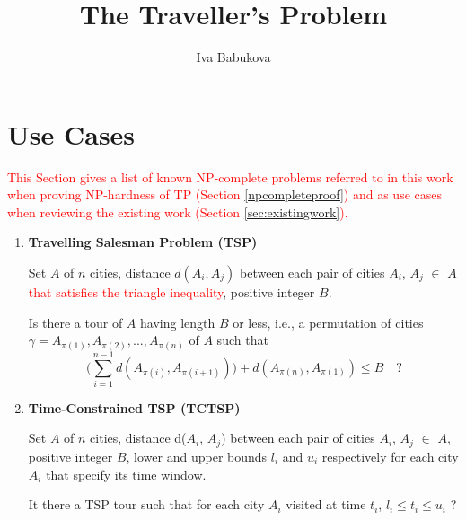 \documentclass{article}
\title{The Traveller's Problem}
\author{Iva Babukova}
\theoremstyle{definition}
\begin{document}
\maketitle

\section{Use Cases}
\label{npcompleteproblems}

\textcolor{red}{This Section gives a list of known NP-complete problems \citep{thebible} referred to in this work when proving NP-hardness of TP (Section \ref{npcompleteproof}) and as use cases when reviewing the existing work (Section \ref{sec:existingwork}).}

\begin{enumerate}
\item \textbf{Travelling Salesman Problem (TSP)}

\begin{instance}
Set $A$ of $n$ cities, distance $d(A_{i}, A_{j})$ between each pair of cities $A_{i}$, $A_{j}$ $\in$ $A$ \textcolor{red}{that satisfies the triangle inequality}, positive integer $B$.
\end{instance}

\begin{question}
Is there a tour of $A$ having length $B$ or less, i.e., a permutation of cities $\gamma = A_{\pi(1)}, A_{\pi(2)},...,A_{\pi(n)}$ of $A$ such that
$$\bigg( \sum_{i=1}^{n-1} d(A_{\pi(i)}, A_{\pi(i+1)}) \bigg) + d(A_{\pi(n)}, A_{\pi(1)}) \leq B \quad \textrm{?}$$
\end{question}

\item \textbf{Time-Constrained TSP (TCTSP)}

\begin{instance}
Set $A$ of $n$ cities, distance d($A_{i}$, $A_{j}$) between each pair of cities $A_{i}$, $A_{j}$ $\in$ $A$, positive integer $B$, lower and upper bounds $l_{i}$ and $u_{i}$ respectively for each city $A_{i}$ that specify its time window.
\end{instance}

\begin{question}
It there a TSP tour such that for each city $A_{i}$ visited at time $t_{i}$, $l_{i} \leq t_{i} \leq u_{i}$ ?
\end{question}

\end{enumerate}
\end{document}
